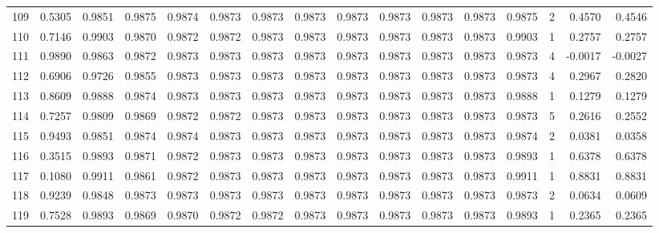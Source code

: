 \begin{tabular}{lrrrrrrrrrrrrrrr}
109 &      0.5305 &  0.9851 &  0.9875 &  0.9874 &  0.9873 &  0.9873 &  0.9873 &  0.9873 &  0.9873 &  0.9873 &   0.9873 &     0.9875 &      2 &                    0.4570 &                     0.4546 \\
110 &      0.7146 &  0.9903 &  0.9870 &  0.9872 &  0.9872 &  0.9873 &  0.9873 &  0.9873 &  0.9873 &  0.9873 &   0.9873 &     0.9903 &      1 &                    0.2757 &                     0.2757 \\
111 &      0.9890 &  0.9863 &  0.9872 &  0.9873 &  0.9873 &  0.9873 &  0.9873 &  0.9873 &  0.9873 &  0.9873 &   0.9873 &     0.9873 &      4 &                   -0.0017 &                    -0.0027 \\
112 &      0.6906 &  0.9726 &  0.9855 &  0.9873 &  0.9873 &  0.9873 &  0.9873 &  0.9873 &  0.9873 &  0.9873 &   0.9873 &     0.9873 &      4 &                    0.2967 &                     0.2820 \\
113 &      0.8609 &  0.9888 &  0.9874 &  0.9873 &  0.9873 &  0.9873 &  0.9873 &  0.9873 &  0.9873 &  0.9873 &   0.9873 &     0.9888 &      1 &                    0.1279 &                     0.1279 \\
114 &      0.7257 &  0.9809 &  0.9869 &  0.9872 &  0.9872 &  0.9873 &  0.9873 &  0.9873 &  0.9873 &  0.9873 &   0.9873 &     0.9873 &      5 &                    0.2616 &                     0.2552 \\
115 &      0.9493 &  0.9851 &  0.9874 &  0.9874 &  0.9873 &  0.9873 &  0.9873 &  0.9873 &  0.9873 &  0.9873 &   0.9873 &     0.9874 &      2 &                    0.0381 &                     0.0358 \\
116 &      0.3515 &  0.9893 &  0.9871 &  0.9872 &  0.9873 &  0.9873 &  0.9873 &  0.9873 &  0.9873 &  0.9873 &   0.9873 &     0.9893 &      1 &                    0.6378 &                     0.6378 \\
117 &      0.1080 &  0.9911 &  0.9861 &  0.9872 &  0.9873 &  0.9873 &  0.9873 &  0.9873 &  0.9873 &  0.9873 &   0.9873 &     0.9911 &      1 &                    0.8831 &                     0.8831 \\
118 &      0.9239 &  0.9848 &  0.9873 &  0.9873 &  0.9873 &  0.9873 &  0.9873 &  0.9873 &  0.9873 &  0.9873 &   0.9873 &     0.9873 &      2 &                    0.0634 &                     0.0609 \\
119 &      0.7528 &  0.9893 &  0.9869 &  0.9870 &  0.9872 &  0.9872 &  0.9873 &  0.9873 &  0.9873 &  0.9873 &   0.9873 &     0.9893 &      1 &                    0.2365 &                     0.2365 \\

\end{tabular}

